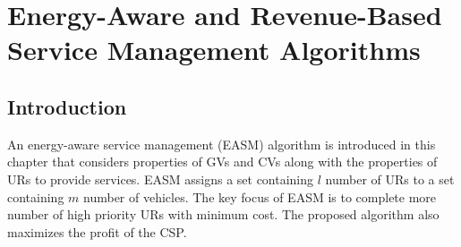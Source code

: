 \setcounter{equation}{0}
\chapter{Energy-Aware and Revenue-Based Service Management Algorithms}
\section{Introduction}
An energy-aware service management  (EASM) algorithm is introduced in this chapter that considers properties of GVs and CVs along with the properties of URs to provide services. EASM assigns a set containing $l$ number of URs to a set containing $m$ number of vehicles. The key focus of EASM is to complete more number of high priority URs with minimum cost. The proposed algorithm also maximizes the profit of the CSP.	

